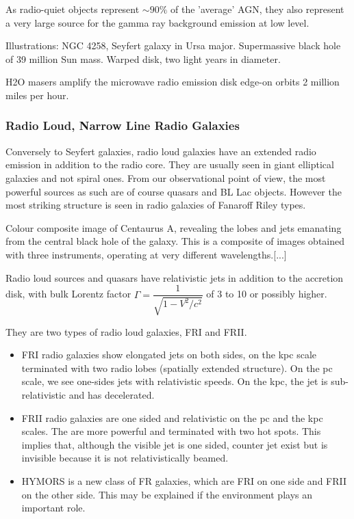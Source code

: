 \documentclass[10pt,a4paper,english]{article}
\begin{document}
As radio-quiet objects represent $\sim 90 \% $ of the 'average' AGN, they also
represent a very large source for the gamma ray background emission at low
level.

Illustrations: NGC 4258, Seyfert galaxy in Ursa major. Supermassive black hole
of 39 million Sun mass. Warped disk, two light years in diameter.

H2O masers amplify the microwave radio emission disk edge-on orbits 2 million
miles per hour.

\subsubsection{Radio Loud, Narrow Line Radio Galaxies}

Conversely to Seyfert galaxies, radio loud galaxies have an extended radio
emission in addition to the radio core. They are usually seen in giant
elliptical galaxies and not spiral ones. From our observational point of view,
the most powerful sources as such are of course quasars and BL Lac objects.
However the most striking structure is seen in radio galaxies of Fanaroff Riley
types.

Colour composite image of Centaurus A, revealing the lobes and jets emanating
from the central black hole of the galaxy. This is a composite of images
obtained with three instruments, operating at very different wavelengths.[...]

Radio loud sources and quasars have relativistic jets in addition to the
accretion disk, with bulk Lorentz factor $\Gamma=\dfrac{1}{\sqrt{1-V^2/c^2}}$
of 3 to 10 or possibly higher.

They are two types of radio loud galaxies, FRI and FRII.
\begin{itemize}
    \item FRI radio galaxies show elongated jets on both sides, on the kpc
          scale terminated with two radio lobes (spatially extended structure).
          On the pc scale, we see one-sides jets with relativistic speeds. On
          the kpc, the jet is sub-relativistic and has decelerated.
    \item FRII radio galaxies are one sided and relativistic on the pc and the
          kpc scales. The are more powerful and terminated with two hot spots.
          This implies that, although the visible jet is one sided, counter jet
          exist but is invisible because it is not relativistically beamed.
    \item HYMORS is a new class of FR galaxies, which are FRI on one side and
          FRII on the other side. This may be explained if the environment
          plays an important role.
\end{itemize}
\end{document}
